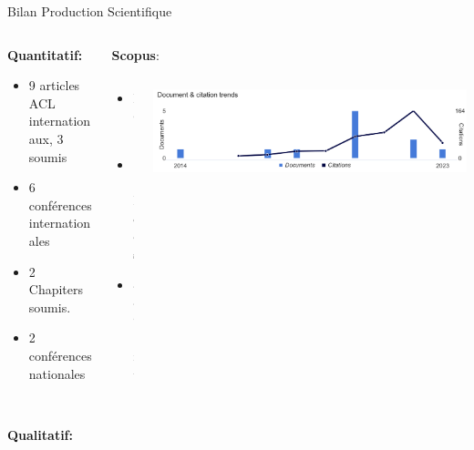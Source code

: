 \documentclass[
  11pt,
  ignorenonframetext,
  aspectratio=169,
  c]{beamer}
\providecommand{\tightlist}{%
  \setlength{\itemsep}{0pt}\setlength{\parskip}{0pt}}\usepackage{longtable,booktabs,array}
\begin{document}
\begin{frame}{Bilan Production Scientifique}
\protect\hypertarget{bilan-production-scientifique}{}
\begin{columns}[T]
\begin{column}[T]{0.5\textwidth}
\scriptsize

\textbf{Quantitatif:}

\begin{itemize}
\tightlist
\item
  9 articles ACL internationaux, 3 soumis\\
\item
  6 conférences internationales\\
\item
  2 Chapiters soumis.
\item
  2 conférences nationales
\end{itemize}
\end{column}

\begin{column}[T]{0.5\textwidth}
\scriptsize

\textbf{Scopus}:

\begin{columns}[T]
\begin{column}[T]{0.3\textwidth}
\scriptsize

\begin{itemize}
\tightlist
\item
  H6,
\item
  11 Docs
\item
  449 Cit.
\end{itemize}
\end{column}

\begin{column}[T]{0.7\textwidth}
\includegraphics{Figures/slides/Scopus.png}
\end{column}
\end{columns}
\end{column}
\end{columns}

\pause

\scriptsize

\textbf{Qualitatif:}


\end{frame}
\end{document}

